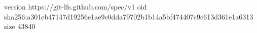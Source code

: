 version https://git-lfs.github.com/spec/v1
oid sha256:a301eb47147d19256e1ae9e0dda79702b1b14a5bf474407c9e613d361e1a6313
size 43840
